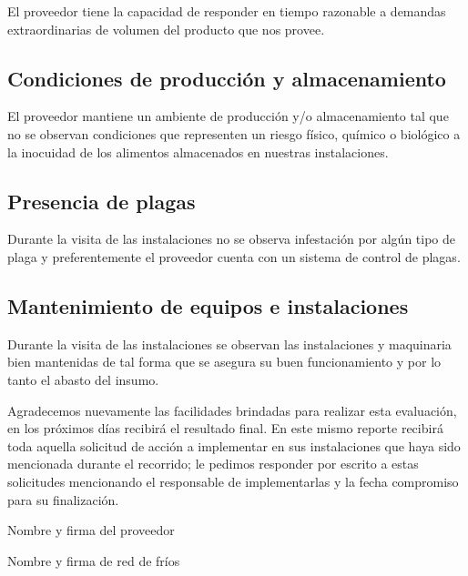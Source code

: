 El proveedor tiene la capacidad de responder en tiempo razonable a demandas extraordinarias de volumen del producto que nos provee.

\subsection{Condiciones de producción y almacenamiento}

El proveedor mantiene un ambiente de producción y/o almacenamiento tal que no se observan condiciones que representen un riesgo físico, químico o biológico a la inocuidad de los alimentos almacenados en nuestras instalaciones.

\subsection{Presencia de plagas}

Durante la visita de las instalaciones no se observa infestación por algún tipo de plaga y preferentemente el proveedor cuenta con un sistema de control de plagas.

\subsection{Mantenimiento de equipos e instalaciones}

Durante la visita de las instalaciones se observan las instalaciones y maquinaria bien mantenidas de tal forma que se asegura su buen funcionamiento y por lo tanto el abasto del insumo.

Agradecemos nuevamente las facilidades brindadas para realizar esta evaluación, en los próximos días recibirá el resultado final. En este mismo reporte recibirá toda aquella solicitud de acción a implementar en sus instalaciones que haya sido mencionada durante el recorrido; le pedimos responder por escrito a estas solicitudes mencionando el responsable de implementarlas y la fecha compromiso para su finalización.


Nombre y firma del proveedor


Nombre y firma de red de fríos
